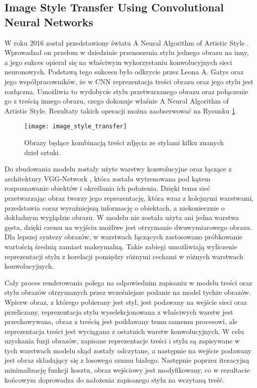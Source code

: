   \subsection{Image Style Transfer Using Convolutional Neural Networks}
    W roku 2016 został przedstawiony światu A Neural Algorithm of Artistic Style
    \cite{image_style_transfer}. Wprowadzał on przełom w dziedzinie przenoszenia
    stylu jednego obrazu na inny, a jego sukces opierał się na właściwym wykorzystaniu
    konwolucyjnych sieci neuronowych. Podstawą tego sukcesu było odkrycie przez
    Leona A. Gatys oraz jego współpracowników, że w CNN reprezentacja treści
    obrazu oraz jego stylu jest rozłączna. Umożliwia to wydobycie stylu
    przetwarzanego obrazu oraz połączenie go z treścią innego obrazu, czego
    dokonuje właśnie A Neural Algorithm of Artistic Style. Rezultaty takich
    operacji można zaobserwować na Rysunku \ref{fig:image_style_transfer}

    \begin{figure}[ht]
      \centering
      \texttt{[image: image\_style\_transfer]}
      \caption{Obrazy będące kombinacją treści zdjęcia ze stylami kilku znanych dzieł sztuki.}
      \label{fig:image_style_transfer}
    \end{figure}

    Do zbudowania modelu zostały użyte warstwy konwolucyjne oraz łączące z
    architektury VGG-Network \cite{vgg_network}, która została wytrenowana pod
    kątem rozpoznawanie obiektów i określania ich położenia. Dzięki temu sieć
    przetwarzając obraz tworzy jego reprezentację, która wraz z
    kolejnymi warstwami, przedstawia coraz wyraźniejszą informację o obiektach,
    a niekoniecznie o dokładnym wyglądzie obrazu.
    W modelu nie została użyta ani jedna warstwa gęsta, dzięki czemu na wyjściu
    możliwe jest otrzymanie dwuwymiarowego obrazu.
    Dla lepszej syntezy obrazów, w warstwach
    łączących zastosowano próbkowanie wartością średnią zamiast maksymalną.
    Takie zabiegi umożliwiają wyliczenie reprezentacji stylu z korelacji
    pomiędzy różnymi cechami w różnych warstwach konwolucyjnych.

    Cały proces renderowania polega na odpowiednim zapisaniu w modelu treści
    oraz stylu obrazów otrzymanych przez wcześniejsze podanie na model tychże
    obrazów. Wpierw obraz, z którego pobierany jest styl, jest podawany na
    wejście sieci oraz przeliczany, reprezentacja stylu wyselekcjonowana z
    właściwych warstw jest przechowywana, obraz z treścią jest poddawany temu samemu
    procesowi, ale reprezentacja treści jest wyciągana z ostatnich
    warstw konwolucyjnych.
    W celu uzyskania fuzji obrazów, zapisane reprezentacje treści i stylu są
    zapisywane w tych warstwach modelu skąd zostały odczytane, a następnie na wejście
    podawany jest obraz składający się z losowego szumu białego.
    Następnie poprzez iteracyjną minimalizację funkcji kosztu, obraz wejściowy jest modyfikowany, co w rezultacie końcowym doprowadza do nałożenia zapisanego
    stylu na wczytaną treść.

